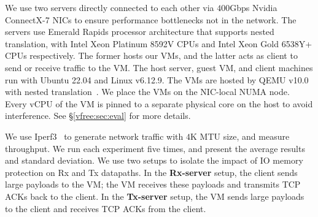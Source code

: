 We use two servers directly connected to each other via $400$Gbps Nvidia ConnectX-7 NICs to ensure performance bottlenecks not in the 
  network. 
The servers use Emerald Rapids processor architecture that supports nested translation,
  with Intel Xeon Platinum 8592V CPUs and Intel Xeon Gold 6538Y+ CPUs respectively. 
The former hosts our VMs, 
  and the latter acts as client to send or receive traffic to the VM. 
The host server, guest VM, and client machines run with Ubuntu 22.04 and Linux v6.12.9. 
The VMs are hosted by QEMU v10.0 with nested translation~\cite{yiliu1765qemu}.
We place the VMs on the NIC-local NUMA node.
Every vCPU of the VM is pinned to a separate physical core on the host to avoid interference. See \S\ref{vfree:sec:eval} for more details.

We use Iperf3~\cite{iperf3} to generate network traffic with $4$K MTU size, and measure throughput.
We run each experiment five times, and present the average results and standard deviation. We use two setups to isolate the impact of IO memory protection on Rx and Tx datapaths. In the {\bf Rx-server} setup, the client sends large payloads to the VM; the VM receives these payloads and transmits TCP ACKs back to the client. In the {\bf Tx-server} setup, the VM sends large payloads to the client and receives TCP ACKs from the client.




